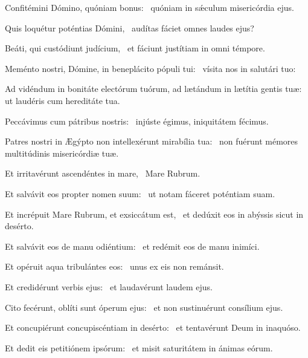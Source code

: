 \item Confitémini Dómino, quóniam bonus:~\psstar{} quóniam in sǽculum misericórdia ejus.

\item Quis loquétur poténtias Dómini,~\psstar{} audítas fáciet omnes laudes ejus?

\item Beáti, qui custódiunt judícium,~\psstar{} et fáciunt justítiam in omni témpore.

\item Meménto nostri, Dómine, in beneplácito pópuli tui:~\psstar{} vísita nos in salutári tuo:

\item Ad vidéndum in bonitáte electórum tuórum, ad lætándum in lætítia gentis tuæ:~\psstar{} ut laudéris cum hereditáte tua.

\item Peccávimus cum pátribus nostris:~\psstar{} injúste égimus, iniquitátem fécimus.

\item Patres nostri in Ægýpto non intellexérunt mirabília tua:~\psstar{} non fuérunt mémores multitúdinis misericórdiæ tuæ.

\item Et irritavérunt ascendéntes in mare,~\psstar{} Mare Rubrum.

\item Et salvávit eos propter nomen suum:~\psstar{} ut notam fáceret poténtiam suam.

\item Et incrépuit Mare Rubrum, et exsiccátum est,~\psstar{} et dedúxit eos in abýssis sicut in desérto.

\item Et salvávit eos de manu odiéntium:~\psstar{} et redémit eos de manu inimíci.

\item Et opéruit aqua tribulántes eos:~\psstar{} unus ex eis non remánsit.

\item Et credidérunt verbis ejus:~\psstar{} et laudavérunt laudem ejus.

\item Cito fecérunt, oblíti sunt óperum ejus:~\psstar{} et non sustinuérunt consílium ejus.

\item Et concupiérunt concupiscéntiam in desérto:~\psstar{} et tentavérunt Deum in inaquóso.

\item Et dedit eis petitiónem ipsórum:~\psstar{} et misit saturitátem in ánimas eórum.
